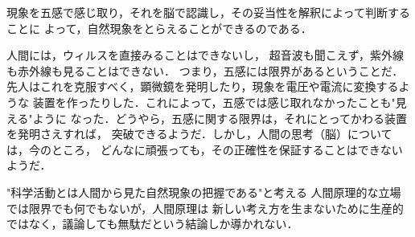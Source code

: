             現象を五感で感じ取り，それを脳で認識し，その妥当性を解釈によって判断することに
            よって，自然現象をとらえることができるのである．

            人間には，ウィルスを直接みることはできないし，
            超音波も聞こえず，紫外線も赤外線も見ることはできない．
            つまり，五感には限界があるということだ．
            先人はこれを克服すべく，顕微鏡を発明したり，現象を電圧や電流に変換するような
            装置を作ったりした．これによって，五感では感じ取れなかったことも"見える"ように
            なった．どうやら，五感に関する限界は，それにとってかわる装置を発明さえすれば，
            突破できるようだ．しかし，人間の思考（脳）については，今のところ，
            どんなに頑張っても，その正確性を保証することはできないようだ．

            "科学活動とは人間から見た自然現象の把握である"と考える
            人間原理的な立場では限界でも何でもないが，人間原理は
            新しい考え方を生まないために生産的ではなく，議論しても無駄だという結論しか導かれない．

